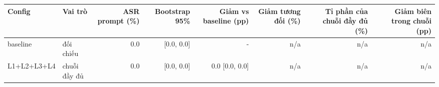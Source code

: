 \begin{tabular}{llrrrrrr}
\toprule
Config & Vai trò & ASR prompt (\%) & Bootstrap 95\% & Giảm vs baseline (pp) & Giảm tương đối (\%) & Tỉ phần của chuỗi đầy đủ (\%) & Giảm biên trong chuỗi (pp) \\
\midrule
baseline & đối chiếu & 0.0 & [0.0, 0.0] & - & n/a & n/a & n/a \\
L1+L2+L3+L4 & chuỗi đầy đủ & 0.0 & [0.0, 0.0] & 0.0 [0.0, 0.0] & n/a & n/a & n/a \\
\bottomrule
\end{tabular}
